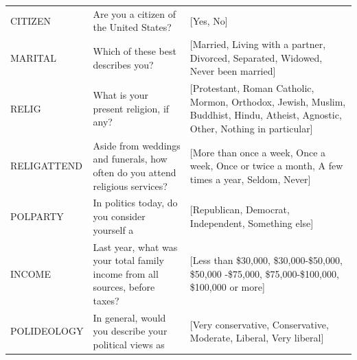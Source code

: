 \begin{table}
\begin{center}
\begin{small}
\begin{tabular}{lp{5cm}p{8cm}}
         CITIZEN &                                       Are you a citizen of the United States? &                                                                                                                                                                                                                                                [Yes, No] \\
         MARITAL &                                            Which of these best describes you? &                                                                                                                                                                       [Married, Living with a partner, Divorced, Separated, Widowed, Never been married] \\
           RELIG &                                        What is your present religion, if any? &            [Protestant, Roman Catholic, Mormon, Orthodox, Jewish, Muslim, Buddhist, Hindu, Atheist, Agnostic, Other, Nothing in particular] \\
     RELIGATTEND & Aside from weddings and funerals, how often do you attend religious services? &                                                                                                                                                           [More than once a week, Once a week, Once or twice a month, A few times a year, Seldom, Never] \\
        POLPARTY &                                 In politics today, do you consider yourself a &                                                                                                                                                                                                      [Republican, Democrat, Independent, Something else] \\
          INCOME &  Last year, what was your total family income from all sources, before taxes? & [Less than \$30,000, \$30,000-\$50,000, \$50,000 -\$75,000, \$75,000-\$100,000,  \$100,000 or more] \\
     POLIDEOLOGY &                        In general, would you describe your political views as &                                                                                                                                                                                       [Very conservative, Conservative, Moderate, Liberal, Very liberal] \\
     \bottomrule
    \end{tabular}
   \end{small}
\end{center}    
\vskip -0.1in
\end{table}

